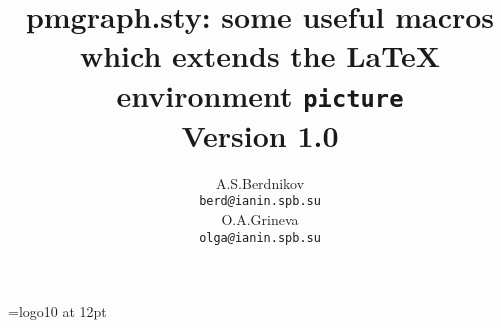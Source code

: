 

\title{{\sc pmgraph.sty}: some useful macros which extends
the \LaTeX{} environment {\tt picture}\\[0.5\baselineskip]
\Large Version 1.0}

\author{
\begin{minipage}{0.4\textwidth}
\begin{center} A.S.Berdnikov\\{\tt berd{\sl @}ianin.spb.su} \end{center}
\end{minipage}
\hfill
\begin{minipage}{0.4\textwidth}
\begin{center} O.A.Grineva\\{\tt olga{\sl @}ianin.spb.su} \end{center}
\end{minipage}
}

\date{}

\def\PiC{P\kern-.12em\lower.5ex\hbox{I}\kern-.075emC\spacefactor1000 }
\font\manual=logo10 at 12pt
\def\MF{{\manual META}\-{\manual FONT}\spacefactor1000 }
\def\AW{Addison\kern.1em-\penalty 0pt \hskip 0pt Wesley}
\def\CandT{{\sl Computers \& Typesetting}}
\def\TUB{{\sl TUGboat\/}}

\newcommand{\bs}{\char '134 }  %
\newcommand{\lb}{\char '173 }  %
\newcommand{\rb}{\char '175 }  %
\makeatletter
\def\hackersmile{\@ifnextchar[{\@hackersmile}{\@hackersmile[10]}}
\def\@hackersmile[#1]{\hbox{%
   \unitlength=1pt\relax
   \unitlength=#1\unitlength
   \divide\unitlength by 10\relax
   \thicklines
   \raise -3\unitlength \hbox{%
   \begin{picture}(12,12)(-6,-6)
   \put(0,0){\circle{10}}
   \put(-2,1.75){\circle*{1}}
   \put(2,1.75){\circle*{1}}
   \thicklines
   \put(-2.75,3){\line(1,0){1.5}}
   \put(2.75,3){\line(-1,0){1.5}}
   \put(0,-1){\line(0,1){3}}
   \put(-2.5,-2.5){\line(1,0){5}}
   \put(-2.5,-2.5){\line(0,1){1}}
   \put(2.5,-2.5){\line(0,1){1}}
   \end{picture}%
}}}
\makeatother

